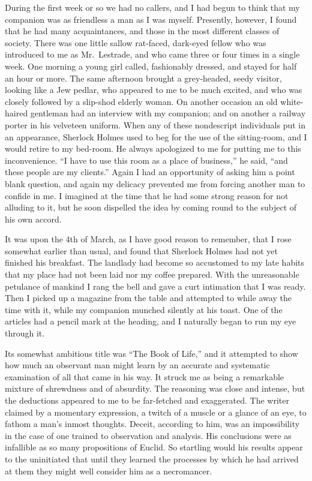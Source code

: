 \documentclass[12pt,english]{book}
\begin{document}
During the first week or so we had no callers, and I had begun to
think that my companion was as friendless a man as I was myself. Presently,
however, I found that he had many acquaintances, and those in the
most different classes of society. There was one little sallow rat-faced,
dark-eyed fellow who was introduced to me as Mr.\ Lestrade, and who
came three or four times in a single week. One morning a young girl
called, fashionably dressed, and stayed for half an hour or more.
The same afternoon brought a grey-headed, seedy visitor, looking like
a Jew pedlar, who appeared to me to be much excited, and who was closely
followed by a slip-shod elderly woman. On another occasion an old
white-haired gentleman had an interview with my companion; and on
another a railway porter in his velveteen uniform. When any of these
nondescript individuals put in an appearance, Sherlock Holmes used
to beg for the use of the sitting-room, and I would retire to my bed-room.
He always apologized to me for putting me to this inconvenience. {}``I
have to use this room as a place of business,'' he said, {}``and
these people are my clients.'' Again I had an opportunity of asking
him a point blank question, and again my delicacy prevented me from
forcing another man to confide in me. I imagined at the time that
he had some strong reason for not alluding to it, but he soon dispelled
the idea by coming round to the subject of his own accord.

It was upon the 4th of March, as I have good reason to remember, that
I rose somewhat earlier than usual, and found that Sherlock Holmes
had not yet finished his breakfast. The landlady had become so accustomed
to my late habits that my place had not been laid nor my coffee prepared.
With the unreasonable petulance of mankind I rang the bell and gave
a curt intimation that I was ready. Then I picked up a magazine from
the table and attempted to while away the time with it, while my companion
munched silently at his toast. One of the articles had a pencil mark
at the heading, and I naturally began to run my eye through it.

Its somewhat ambitious title was {}``The Book of Life,'' and it
attempted to show how much an observant man might learn by an accurate
and systematic examination of all that came in his way. It struck
me as being a remarkable mixture of shrewdness and of absurdity. The
reasoning was close and intense, but the deductions appeared to me
to be far-fetched and exaggerated. The writer claimed by a momentary
expression, a twitch of a muscle or a glance of an eye, to fathom
a man's inmost thoughts. Deceit, according to him, was an impossibility
in the case of one trained to observation and analysis. His conclusions
were as infallible as so many propositions of Euclid. So startling
would his results appear to the uninitiated that until they learned
the processes by which he had arrived at them they might well consider
him as a necromancer.
\end{document}
